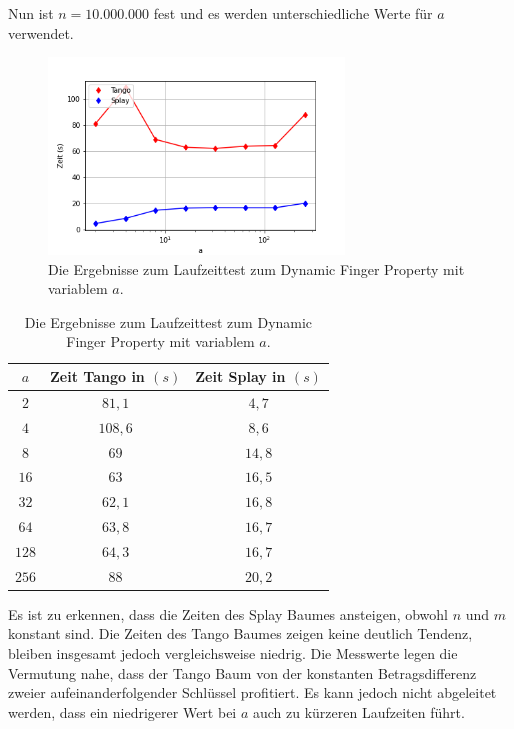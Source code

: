 \documentclass[a4paper,12pt]{article}
\begin{document}
\noindent Nun ist $n = 10.000.000$ fest und es werden unterschiedliche Werte für $a$ verwendet.

\begin{figure}[H]
	\centering
	\includegraphics[width=0.7\textwidth]{Medien/laufzeittest/diagramm/dynamicfingerNfest}
	\caption{Die Ergebnisse zum Laufzeittest zum Dynamic Finger Property mit variablem $a$.}
\end{figure}
\begin{table}[H]
	\begin{center}
		\begin{tabular}[c]{|c|c|c|}
			\hline
			$a$ & Zeit Tango in $\left(s\right)$ &Zeit Splay in $\left(s\right)$ \\
			\hline
			$2$ & $81,1$ &$4,7$ \\
			\hline
			$4$  & $108,6$ &$8,6$  \\
			\hline
			$8$  & $69$ &$14,8$  \\
			\hline
			$16$  & $63$ &$16,5$  \\
			\hline
			$32$  & $62,1$ &$16,8$  \\
			\hline
			$64$  & $63,8$ &$16,7$  \\
			\hline
			$128$  & $64,3$ &$16,7$  \\
			\hline
			$256$  & $88$ &$20,2$  \\
			\hline
		\end{tabular}
		\caption {Die Ergebnisse zum Laufzeittest zum Dynamic Finger Property mit variablem $a$.} 
	\end{center}
\end{table}\noindent Es ist zu erkennen, dass die Zeiten des Splay Baumes ansteigen, obwohl $n$ und $m$ konstant sind. Die Zeiten des Tango Baumes zeigen keine deutlich Tendenz, bleiben insgesamt jedoch vergleichsweise niedrig. Die Messwerte legen die Vermutung nahe, dass der Tango Baum von der konstanten Betragsdifferenz zweier aufeinanderfolgender Schlüssel profitiert. Es kann jedoch nicht abgeleitet werden, dass ein niedrigerer Wert bei $a$ auch zu kürzeren Laufzeiten führt.  
\end{document}
